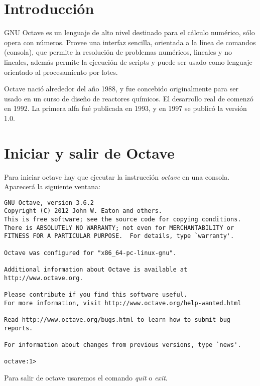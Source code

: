 \documentclass[a4,12pt,graphicx,caption,rotating]{article}
\begin{document}
\section{Introducción}
GNU Octave es un lenguaje de alto nivel destinado para el cálculo numérico, sólo opera con números. Provee una interfaz sencilla, orientada a la línea de comandos (consola), que permite la resolución de problemas numéricos, lineales y no lineales, además permite la ejecución de scripts y puede ser usado como lenguaje orientado al procesamiento por lotes.

Octave nació alrededor del año 1988, y fue concebido originalmente para ser usado en un curso de diseño de reactores químicos. El desarrollo real de comenzó en 1992. La primera alfa fué publicada en 1993, y en 1997 se publicó la versión 1.0.

\section{Iniciar y salir de Octave}
Para iniciar octave hay que ejecutar la instrucción \emph{octave} en una consola. Aparecerá la siguiente ventana:
\begin{verbatim}
GNU Octave, version 3.6.2
Copyright (C) 2012 John W. Eaton and others.
This is free software; see the source code for copying conditions.
There is ABSOLUTELY NO WARRANTY; not even for MERCHANTABILITY or
FITNESS FOR A PARTICULAR PURPOSE.  For details, type `warranty'.

Octave was configured for "x86_64-pc-linux-gnu".

Additional information about Octave is available at http://www.octave.org.

Please contribute if you find this software useful.
For more information, visit http://www.octave.org/help-wanted.html

Read http://www.octave.org/bugs.html to learn how to submit bug reports.

For information about changes from previous versions, type `news'.

octave:1>
\end{verbatim}

Para salir de octave usaremos el comando \emph{quit} o \emph{exit}.
\end{document}
